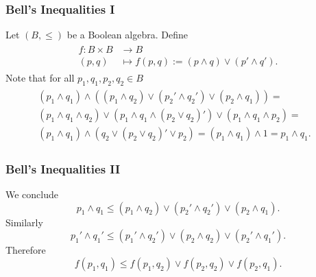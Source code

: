 \documentclass{beamer}
\begin{document}
\begin{frame}

	\frametitle{Bell's Inequalities I}
	
	Let $(B,\leq)$ be a Boolean algebra. Define
	\begin{align}
	\begin{split}
		f:B\times B&\rightarrow B\\
		(p,q)&\mapsto f(p,q):=(p\wedge q)\vee(p'\wedge q').
	\end{split}
	\end{align}
	Note that for all $p_1,q_1,p_2,q_2\in B$
	\begin{align}
	\begin{split}
		(p_1\wedge q_1)\wedge((p_1\wedge q_2)\vee(p_2'\wedge q_2')\vee(p_2\wedge q_1))=&\\
		(p_1\wedge q_1\wedge q_2)\vee(p_1\wedge q_1\wedge (p_2\vee q_2)')\vee(p_1\wedge q_1\wedge p_2)=&\\
		(p_1\wedge q_1)\wedge(q_2\vee(p_2\vee q_2)'\vee p_2)=(p_1\wedge q_1)\wedge 1=p_1\wedge q_1.&
	\end{split}
	\end{align}

\end{frame}
	
\begin{frame}
	
	\frametitle{Bell's Inequalities II}
	
	We conclude
	\begin{equation}
		p_1\wedge q_1\leq(p_1\wedge q_2)\vee(p_2'\wedge q_2')\vee(p_2\wedge q_1). 
	\end{equation}	
	Similarly
	\begin{equation}
		p_1'\wedge q_1'\leq(p_1'\wedge q_2')\vee(p_2\wedge q_2)\vee(p_2'\wedge q_1').
	\end{equation}
	Therefore
	\begin{equation}
		f(p_1,q_1)\leq f(p_1,q_2)\vee f(p_2,q_2)\vee f(p_2,q_1).
	\end{equation}	 
	
\end{frame}		
\end{document}
